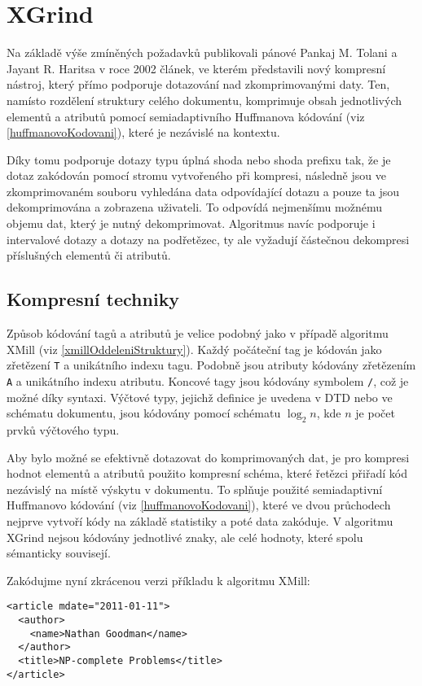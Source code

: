 \section{XGrind}
Na základě výše zmíněných požadavků publikovali pánové Pankaj M. Tolani a Jayant R. Haritsa v roce 2002 článek, ve kterém představili nový kompresní nástroj, který přímo podporuje dotazování nad zkomprimovanými daty. Ten, namísto rozdělení struktury celého dokumentu, komprimuje obsah jednotlivých elementů a atributů pomocí semiadaptivního Huffmanova kódování (viz \ref{huffmanovoKodovani}), které je nezávislé na kontextu.

Díky tomu podporuje dotazy typu úplná shoda nebo shoda prefixu tak, že je dotaz zakódován pomocí stromu vytvořeného při kompresi, následně jsou ve zkomprimovaném souboru vyhledána data odpovídající dotazu a pouze ta jsou dekomprimována a zobrazena uživateli. To odpovídá nejmenšímu možnému objemu dat, který je nutný dekomprimovat. Algoritmus navíc podporuje i intervalové dotazy a dotazy na podřetězec, ty ale vyžadují částečnou dekompresi příslušných elementů či atributů. \cite{xgrind}

\subsection{Kompresní techniky}
\label{xgrindKompresniTechniky}
Způsob kódování tagů a atributů je velice podobný jako v případě algoritmu XMill (viz \ref{xmillOddeleniStruktury}). Každý počáteční tag je kódován jako zřetězení \texttt{T} a unikátního indexu tagu. Podobně jsou atributy kódovány zřetězením \texttt{A} a unikátního indexu atributu. Koncové tagy jsou kódovány symbolem \texttt{/}, což je možné díky syntaxi. Výčtové typy, jejichž definice je uvedena v DTD nebo ve schématu dokumentu, jsou kódovány pomocí schématu $\log_2n$, kde $n$ je počet prvků výčtového typu.

Aby bylo možné se efektivně dotazovat do komprimovaných dat, je pro kompresi hodnot elementů a atributů použito kompresní schéma, které řetězci přiřadí kód nezávislý na místě výskytu v dokumentu. To splňuje použité semiadaptivní Huffmanovo kódování (viz \ref{huffmanovoKodovani}), které ve dvou průchodech nejprve vytvoří kódy na základě statistiky a poté data zakóduje. V algoritmu XGrind nejsou kódovány jednotlivé znaky, ale celé hodnoty, které spolu sémanticky souvisejí. \cite{xgrind}

Zakódujme nyní zkrácenou verzi příkladu k algoritmu XMill:
\begin{verbatim}
<article mdate="2011-01-11">
  <author>
    <name>Nathan Goodman</name>
  </author>
  <title>NP-complete Problems</title>
</article>
\end{verbatim}


